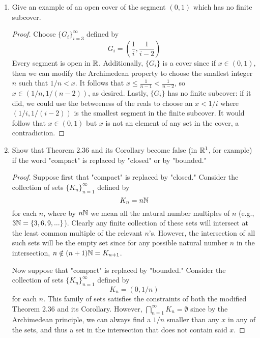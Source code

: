 \documentclass[../psets.tex]{subfiles}
\begin{document}
\begin{enumerate}[label={\textbf{\arabic*.}}]
\begin{proof}
    \end{proof}
    \item Give an example of an open cover of the segment $(0,1)$ which has no finite subcover.
    \begin{proof}
        Choose $\{G_i\}_{i=3}^\infty$ defined by
        \begin{equation*}
            G_i = \left( \frac{1}{i},\frac{1}{i-2} \right)
        \end{equation*}
        Every segment is open in $\mathbb{R}$. Additionally, $\{G_i\}$ is a cover since if $x\in(0,1)$, then we can modify the Archimedean property to choose the smallest integer $n$ such that $1/n<x$. It follows that $x\leq\frac{1}{n-1}<\frac{1}{n-2}$, so $x\in(1/n,1/(n-2))$, as desired. Lastly, $\{G_i\}$ has no finite subcover: if it did, we could use the betweeness of the reals to choose an $x<1/i$ where $(1/i,1/(i-2))$ is the smallest segment in the finite subcover. It would follow that $x\in(0,1)$ but $x$ is not an element of any set in the cover, a contradiction.
    \end{proof}
    \item Show that Theorem 2.36 and its Corollary become false (in $\mathbb{R}^1$, for example) if the word "compact" is replaced by "closed" or by "bounded."
    \begin{proof}
        Suppose first that "compact" is replaced by "closed." Consider the collection of sets $\{K_n\}_{n=1}^\infty$ defined by
        \begin{equation*}
            K_n = n\mathbb{N}
        \end{equation*}
        for each $n$, where by $n\mathbb{N}$ we mean all the natural number multiples of $n$ (e.g., $3\mathbb{N}=\{3,6,9,...\}$). Clearly any finite collection of these sets will intersect at the least common multiple of the relevant $n$'s. However, the intersection of all such sets will be the empty set since for any possible natural number $n$ in the intersection, $n\notin(n+1)\mathbb{N}=K_{n+1}$.\par
        Now suppose that "compact" is replaced by "bounded." Consider the collection of sets $\{K_n\}_{n=1}^\infty$ defined by
        \begin{equation*}
            K_n = (0,1/n)
        \end{equation*}
        for each $n$. This family of sets satisfies the constraints of both the modified Theorem 2.36 and its Corollary. However, $\bigcap_{n=1}^\infty K_n=\emptyset$ since by the Archimedean principle, we can always find a $1/n$ smaller than any $x$ in any of the sets, and thus a set in the intersection that does not contain said $x$.
    \end{proof}
\end{enumerate}
\end{document}
